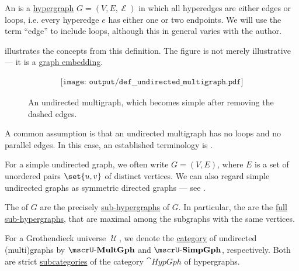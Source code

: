 \begin{definition}\label{def:undirected_multigraph}
  An  is a \hyperref[def:hypergraph]{hypergraph} \( G = (V, E, \mscrE) \) in which all hyperedges are either edges or loops, i.e. every hyperedge \( e \) has either one or two endpoints. We will use the term \enquote{edge} to include loops, although this in general varies with the author.

   illustrates the concepts from this definition. The figure is not merely illustrative --- it is a \hyperref[def:quiver_geometric_realization/embedding]{graph embedding}.

  \begin{figure}
    \begin{equation}\label{eq:fig:def:undirected_multigraph}
      \begin{aligned}
        \texttt{[image: output/def\_\_undirected\_multigraph.pdf]}
      \end{aligned}
    \end{equation}
    \caption{An undirected multigraph, which becomes simple after removing the dashed edges.}\label{fig:def:undirected_multigraph}
  \end{figure}

  \begin{thmenum}
     A common assumption is that an undirected multigraph has no loops and no parallel edges. In this case, an established terminology is .

    For a simple undirected graph, we often write \( G = (V, E) \), where \( E \) is a set of unordered pairs \( \set{ u, v } \) of distinct vertices. We can also regard simple undirected graphs as symmetric directed graphs --- see .

     The  of \( G \) are the precisely \hyperref[def:hypergraph/submodel]{sub-hypergraphs} of \( G \). In particular, the  are the \hyperref[eq:def:hypergraph/submodel/full]{full sub-hypergraphs}, that are maximal among the subgraphs with the same vertices.

     For a Grothendieck universe \( \mscrU \), we denote the \hyperref[def:category]{category} of undirected (multi)graphs by \( \ucat{MultGph} \) and \( \ucat{SimpGph} \), respectively. Both are strict \hyperref[def:subcategory]{subcategories} of the category \hyperref[def:category_of_small_hypergraphs]{\( \cat{HypGph} \)} of hypergraphs.
  \end{thmenum}
\end{definition}

